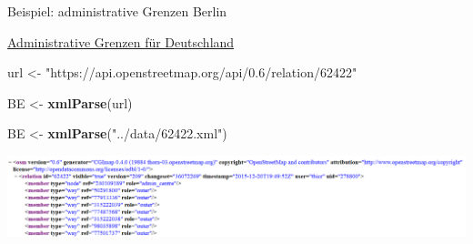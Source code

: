 \documentclass[ignorenonframetext,]{beamer}
\newenvironment{Shaded}{\begin{snugshade}}{\end{snugshade}}
\newcommand{\KeywordTok}[1]{\textcolor[rgb]{0.13,0.29,0.53}{\textbf{#1}}}
\newcommand{\NormalTok}[1]{#1}
\newcommand{\StringTok}[1]{\textcolor[rgb]{0.31,0.60,0.02}{#1}}
\begin{document}
\begin{frame}[fragile]{Beispiel: administrative Grenzen Berlin}
\protect\hypertarget{beispiel-administrative-grenzen-berlin}{}

\href{http://wiki.openstreetmap.org/wiki/DE:Grenze\#Bundesl.C3.A4ndergrenze_-_admin_level.3D4}{Administrative
Grenzen für Deutschland}

\begin{Shaded}
\begin{Highlighting}[]
\NormalTok{url <-}\StringTok{ "https://api.openstreetmap.org/api/0.6/relation/62422"}
\end{Highlighting}
\end{Shaded}

\begin{Shaded}
\begin{Highlighting}[]
\NormalTok{BE <-}\StringTok{ }\KeywordTok{xmlParse}\NormalTok{(url)}
\end{Highlighting}
\end{Shaded}

\begin{Shaded}
\begin{Highlighting}[]
\NormalTok{BE <-}\StringTok{ }\KeywordTok{xmlParse}\NormalTok{(}\StringTok{"../data/62422.xml"}\NormalTok{)}
\end{Highlighting}
\end{Shaded}

\includegraphics{figure/ExampleAdmBE.PNG}

\end{frame}
\end{document}
